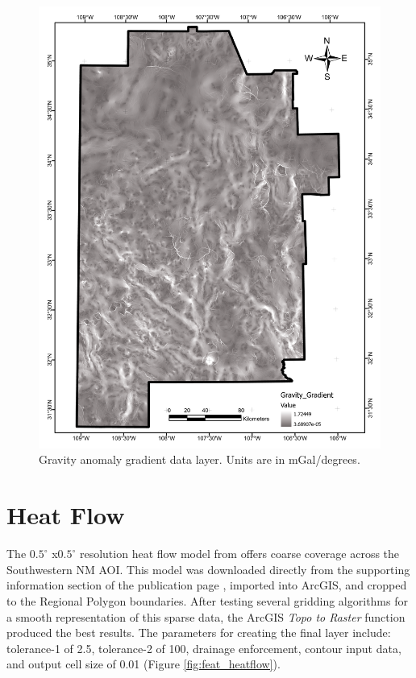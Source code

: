 \begin{figure}[H]
\centering
\includegraphics[width=0.75\linewidth]{templates/images/Figure-GravityGradient.pdf}
\caption[Gravity anomaly gradient data layer]{Gravity anomaly gradient data layer. Units are in mGal/degrees.}
\label{fig:feat_gravity_gradient}
\end{figure}
\pagebreak

\section{Heat Flow}\label{app:dl_heat_flow}
The $0.5^\circ$ x$0.5^\circ$ resolution heat flow model from \citet{lucazeau_analysis_2019} offers coarse coverage across the Southwestern NM AOI. This model was downloaded directly from the supporting information section of the publication page \citep{lucazeau_analysis_2019}, imported into ArcGIS, and cropped to the Regional Polygon boundaries. After testing several gridding algorithms for a smooth representation of this sparse data, the ArcGIS \textit{Topo to Raster} function produced the best results. The parameters for creating the final layer include: tolerance-1 of 2.5, tolerance-2 of 100, drainage enforcement, contour input data, and output cell size of 0.01 (Figure \ref{fig:feat_heatflow}).
\vfill
\pagebreak

